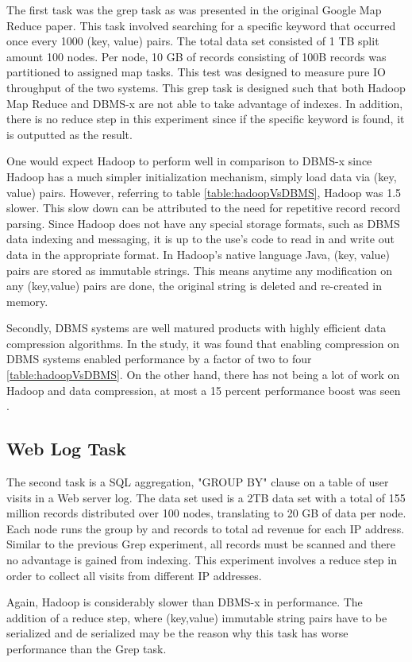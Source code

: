 \documentclass[10pt,twocolumn]{IEEEtran11}
\begin{document}
The first task was the grep task as was presented in the original Google Map Reduce paper.  This task involved searching for a specific keyword that occurred once every 1000 (key, value) pairs.   The total data set consisted of 1 TB split amount 100 nodes.  Per node, 10 GB of records consisting of 100B records was partitioned to assigned map tasks.  This test was designed to measure pure IO throughput of the two systems.  This grep task is designed such that both Hadoop Map Reduce and DBMS-x are not able to take advantage of indexes.  In addition, there is no reduce step in this experiment since if the specific keyword is found, it is outputted as the result.
\par
One would expect Hadoop to perform well in comparison to DBMS-x since Hadoop has a much simpler initialization mechanism, simply load data via (key, value) pairs.  However, referring to table \ref{table:hadoopVsDBMS}, Hadoop was 1.5 slower.  This slow down can be attributed to the need for repetitive record record parsing.  Since Hadoop does not have any special storage formats, such as DBMS data indexing and messaging, it is up to the use's code to  read in and write out data in the appropriate format.  In Hadoop's native language Java, (key, value) pairs are stored as immutable strings.  This means anytime any modification on any (key,value) pairs are done, the original string is deleted and re-created in memory.
\par
Secondly, DBMS systems are well matured products with highly efficient data compression algorithms.  In the study, it was found that enabling compression on DBMS systems enabled performance by a factor of two to four \ref{table:hadoopVsDBMS}.  On the other hand, there has not being a lot of work on Hadoop and data compression, at most a 15 percent performance boost was seen \cite{dean2001mapreduce}.

\subsection{Web Log Task}
The second task is a SQL aggregation, "GROUP BY" clause on a table of user visits in a Web server log.  The data set used is a 2TB data set with a total of 155 million records distributed over 100 nodes, translating to 20 GB of data per node.  Each node runs the group by and records to total ad revenue for each IP address.  Similar to the previous Grep experiment, all records must be scanned and there no advantage is gained from indexing.  This experiment involves a reduce step in order to collect all visits from different IP addresses.
\par
Again, Hadoop is considerably slower than DBMS-x in performance.  The addition of a reduce step, where (key,value) immutable string pairs have to be serialized and de serialized may be the reason why this task has worse performance than the Grep task.
\end{document}
